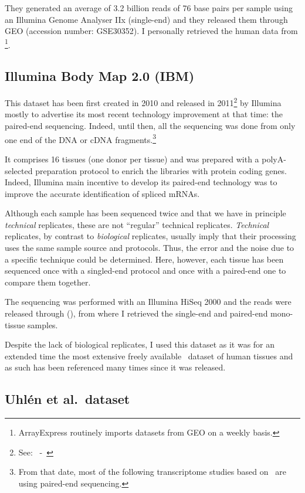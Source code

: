 They generated an average of 3.2 billion reads of 76 base pairs per sample
using an Illumina Genome Analyser IIx (single-end) and they released them
through \gls{GEO} (accession number: GSE30352).
I personally retrieved the human data from
\footnote{ArrayExpress routinely imports
datasets from \gls{GEO} on a weekly basis.}.


\subsection{Illumina Body Map 2.0 (IBM)}
\label{subsec:ibmpresentation}
This dataset has been first created in 2010 and released in
2011\footnote{See:~ -~\cite{ibmEnsembl}} by Illumina
mostly to advertise its most recent technology improvement at that time:
the paired-end sequencing. Indeed, until then, all the sequencing was done
from only one end of the \gls{DNA} or \gls{cDNA} fragments.\footnote{From that
date, most of the following transcriptome studies based on \Rnaseq\ are using
paired-end sequencing.}

It comprises 16 tissues (one donor per tissue) and was prepared with a
polyA-selected preparation protocol to enrich the libraries with protein
coding genes. Indeed, Illumina main incentive to develop its paired-end
technology was to improve the accurate identification of spliced \glspl{mRNA}.

Although each sample has been sequenced twice and that we have in principle
\emph{technical} replicates, these are not ``regular'' technical replicates.
\emph{Technical} replicates, by contrast to \emph{biological} replicates,
usually imply that their processing uses the same sample source and protocols.
Thus, the error and the noise due to a specific technique could be determined.
Here, however, each tissue has been sequenced once with a singled-end protocol
and once with a paired-end one to compare them together.

The sequencing was performed with an Illumina HiSeq 2000 and the reads were
released through  (), from where I
retrieved the single-end and paired-end mono-tissue samples.

Despite the lack of biological replicates, I used this dataset as it was for an
extended time the most extensive freely available \Rnaseq\ dataset of human
tissues and as such has been referenced many times since it was released.

\subsection{Uhlén et al.\ dataset}\label{subsec:uhlenPresentation}

